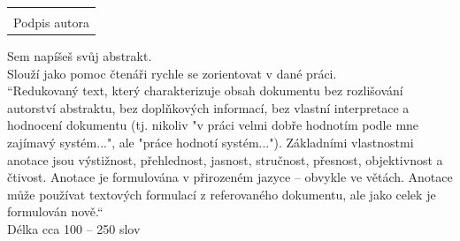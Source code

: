 \documentclass[12pt, a4paper,
twoside,        %
openright
]{report}
\newcommand\datumOdevzdani{1. 1. 2024} %
\begin{document}
\cleardoublepage %
	

	
	\noindent 
	
	\vspace*{0.7\textheight} %

	\vfill
	\noindent{V Opavě \datumOdevzdani\\}
	\noindent
	\begin{minipage}{\linewidth}
		\hspace{9.5cm} 
		\begin{tabular}{@{}p{6cm}@{}}
			\dotfill \\
			Podpis autora
		\end{tabular}
	\end{minipage}
	
	\cleardoublepage %


	\noindent Sem napíšeš svůj abstrakt.\\
	Slouží jako pomoc čtenáři rychle se zorientovat v dané práci.\\
	“Redukovaný text, který charakterizuje obsah dokumentu bez rozlišování autorství abstraktu, bez doplňkových informací, bez vlastní interpretace a hodnocení dokumentu (tj. nikoliv "v práci velmi dobře hodnotím podle mne zajímavý systém...", ale "práce hodnotí systém..."). Základními vlastnostmi anotace jsou výstižnost, přehlednost, jasnost, stručnost, přesnost, objektivnost a čtivost. Anotace je formulována v přirozeném jazyce – obvykle ve větách. Anotace může používat textových formulací z referovaného dokumentu, ale jako celek je formulován nově.“\\
	Délka cca 100 – 250 slov
	
\end{document}
